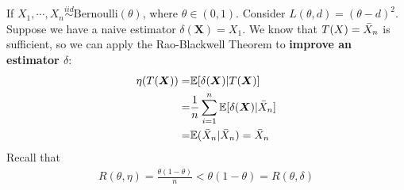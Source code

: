 \begin{example}
    If $X_1,\cdots,X_n\overset{iid}{\sim}\text{Bernoulli}(\theta)$, where $\theta\in(0,1)$.
    Consider $L(\theta,d)=(\theta-d)^2$. 
    Suppose we have a naive estimator $\delta(\boldsymbol{X})=X_1$.
    We know that $T(X)=\Bar{X}_n$ is sufficient,
    so we can apply the Rao-Blackwell Theorem to \textbf{improve an estimator $\delta$}:
    \begin{align}
        \eta(T(\boldsymbol{X}))
        =& \mathbb{E}[\delta(\boldsymbol{X})|T(\boldsymbol{X})]\\
        =& \frac{1}{n}\sum_{i=1}^n\mathbb{E}[\delta(\boldsymbol{X})|\Bar{X}_n]\\
        =& \mathbb{E}(\Bar{X}_n|\Bar{X}_n) = \Bar{X}_n
    \end{align}
    Recall that 
    \begin{gather}
        R(\theta,\eta)=\frac{\theta(1-\theta)}{n}<\theta(1-\theta)=R(\theta,\delta)
    \end{gather}
\end{example}

\newpage